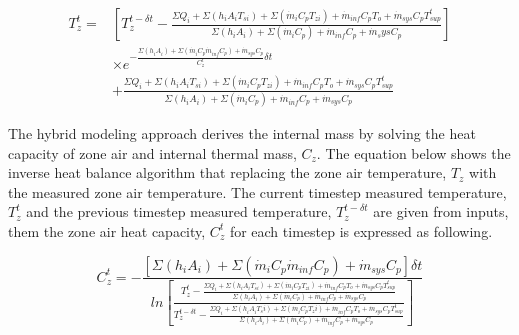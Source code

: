 \begin{equation}
\begin{aligned}
T_z^t = &\left[T_z^{t-\delta t} - \frac {\Sigma Q_i + \Sigma (h_i A_i T_{si}) + \Sigma (\dot{m}_i C_p T_{zi}) +\dot{m}_{inf} C_p T_o + \dot{m}_{sys} C_pT_{sup}^t} {\Sigma (h_i A_i)  + \Sigma(\dot{m}_i C_p) + \dot{m}_{inf} C_p + \dot{m}_sys C_p}\right]\\ &\times e^{ - \frac {\Sigma (h_i A_i) + \Sigma (\dot{m}_i C_p \dot{m}_{inf} C_p)+ \dot{m}_{sys} C_p} {C_z^t } \delta t} \\ &+ \frac {\Sigma Q_i +\Sigma(h_i A_i T_{si}) + \Sigma(\dot{m}_i C_p T_{zi}) + \dot{m}_{inf} C_p T_o + \dot{m}_{sys} C_p T_{sup}^t} {\Sigma(h_i A_i) +\Sigma(\dot{m}_i C_p)  + \dot{m}_{inf} C_p + \dot{m}_{sys} C_p }
\end{aligned}
\end{equation}

The hybrid modeling approach derives the internal mass by solving the heat capacity of zone air and internal thermal mass, $C_z$. The equation below shows the inverse heat balance algorithm that replacing the zone air temperature, $T_z$ with the measured zone air temperature. The current timestep measured temperature, $T_z^t$  and the previous timestep measured temperature, $T_z^{t-\delta t}$ are given from inputs, them the zone air heat capacity, $C_z^t$ for each timestep is expressed as following. 

\begin{equation}
C_z^t = - \frac {[\Sigma (h_i A_i) + \Sigma (\dot{m}_i C_p \dot{m}_{inf} C_p) + \dot{m}_{sys} C_p ] \delta t}{ ln⁡ \left[ \frac { T_z^t - \frac { \Sigma Q_i +\Sigma (h_i A_i T_{si}) + \Sigma (\dot{m}_i C_p T_{zi}) + \dot{m}_{inf} C_p T_o + \dot{m}_{sys} C_p T_{sup}^t} {\Sigma (h_i A_i)  + \Sigma (\dot{m}_i C_p)  + \dot{m}_{inf} C_p + \dot{m}_{sys} C_p}} {T_z^{t-\delta t} - \frac {\Sigma Q_i +\Sigma (h_i A_i T_si)  + \Sigma (\dot{m}_i C_p T_zi) + \dot{m}_{inf} C_p T_o + \dot{m}_{sys} C_p T_{sup}^t} {\Sigma (h_i A_i) + \Sigma (\dot{m}_i C_p)  + \dot{m}_{inf} C_p + \dot{m}_{sys} C_p}} \right]}
\end{equation}

